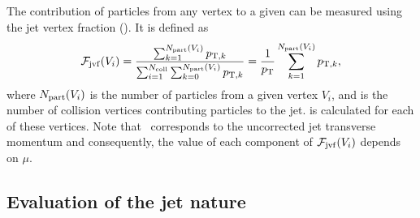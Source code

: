 The contribution of particles from any vertex to a given \pujet{} can be measured using the jet vertex fraction (\JVF). It is defined as 
\begin{equation}
    \mathcal{F}_{\mathrm{jvf}}(V_i) = \dfrac{\sum_{k = 1}^{N_{\mathrm{part}}(V_{i})} p_{\mathrm{T},k}}{\sum_{i=1}^{N_{\mathrm{coll}}}\sum_{k=0}^{N_{\mathrm{part}}(V_{i})} p_{\mathrm{T},k}} = \dfrac{1}{p_{\mathrm{T}}} \sum_{k = 1}^{N_{\mathrm{part}}(V_{i})} p_{\mathrm{T},k} ,
\label{eq:JVF}
\end{equation} 
where $N_{\mathrm{part}}(V_{i})$ is the number of particles from a given vertex $V_{i}$, and \Ncoll{} is the number of collision vertices contributing particles to the jet. \JVF{} is calculated for each of these vertices. 
Note that \pT\ corresponds to the uncorrected jet transverse momentum and consequently, the 
value of each component of $\mathcal{F}_{\mathrm{jvf}}(V_i)$ depends on $\mu$. 


\subsection{Evaluation of the \pu{} jet nature}


